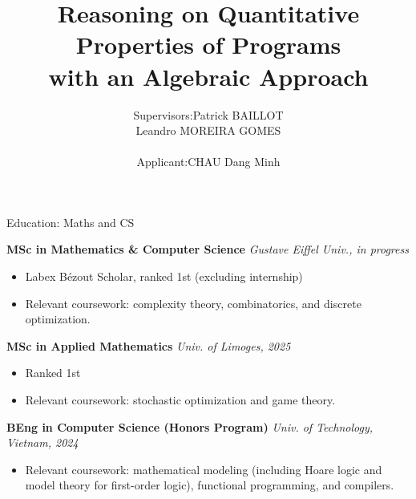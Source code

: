 \documentclass[xcolor=dvipsnames, aspectratio=169, 10pt]{beamer}
\title[]{Reasoning on Quantitative Properties of Programs \\ with an Algebraic Approach}
\author[Minh]{
		\begin{tabular}{lll}
      {\small Supervisors:} & \small Patrick BAILLOT \\
      & Leandro MOREIRA GOMES\\\\
			{\small Applicant:} & \small CHAU Dang Minh
		\end{tabular}
	}
\begin{document}
\date{}
\begin{frame}
  \titlepage
\end{frame}

\begin{frame}{Education: Maths and CS}

  \textbf{MSc in Mathematics \& Computer Science} \hfill \textit{Gustave Eiffel Univ., in progress}
  \begin{itemize}
    \item Labex Bézout Scholar, ranked 1st (excluding internship)
    \item Relevant coursework: complexity theory, combinatorics, and discrete optimization.
  \end{itemize}

  \textbf{MSc in Applied Mathematics} \hfill \textit{Univ. of Limoges, 2025}
  \begin{itemize}
    \item Ranked 1st
    \item Relevant coursework: stochastic optimization and game theory.
  \end{itemize}

  \textbf{BEng in Computer Science (Honors Program)} \hfill \textit{Univ. of Technology, Vietnam, 2024}
  \begin{itemize}
    \item Relevant coursework: mathematical modeling (including Hoare logic and model theory for first-order logic), functional programming, and compilers.
  \end{itemize}

\end{frame}
\end{document}
